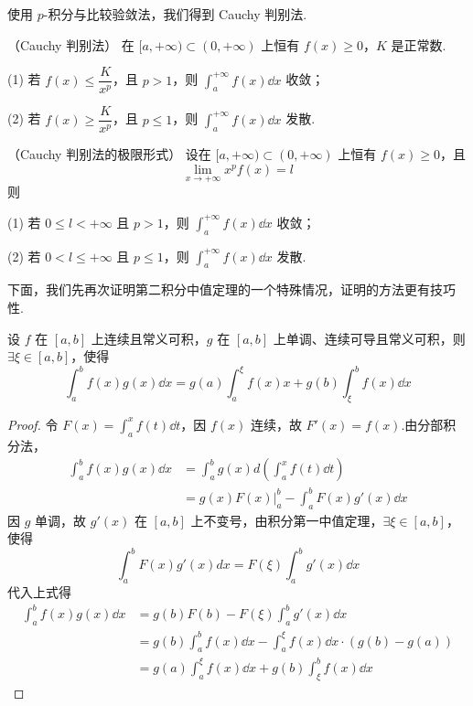 使用 $p$-积分与比较验敛法，我们得到 Cauchy 判别法.
\begin{corollary}
	（Cauchy 判别法）
	在 $[a,+\infty) \subset (0,+\infty)$ 上恒有 $f(x) \ge 0$，$K$ 是正常数.
	
	(1) 若 $f(x) \le \dfrac{K}{x^p}$，且 $p>1$，则 $\displaystyle\int_a^{+\infty} f(x)\dd x$ 收敛；
	
	(2) 若 $f(x) \ge \dfrac{K}{x^p}$，且 $p \le 1$，则 $\displaystyle\int_a^{+\infty} f(x)\dd x$ 发散.
\end{corollary}
\begin{corollary}
	（Cauchy 判别法的极限形式）
	设在 $[a,+\infty) \subset (0,+\infty)$ 上恒有 $f(x) \ge 0$，且
	\[
	\lim_{x \to +\infty} x^p f(x) = l
	\]
	则
	
	(1) 若 $0 \le l < +\infty$ 且 $p>1$，则 $\displaystyle\int_a^{+\infty} f(x)\dd x$ 收敛；
	
	(2) 若 $0 < l \le +\infty$ 且 $p \le 1$，则 $\displaystyle\int_a^{+\infty} f(x)\dd x$ 发散.
\end{corollary}


下面，我们先再次证明第二积分中值定理的一个特殊情况，证明的方法更有技巧性.
\begin{proposition}
	设 $f$ 在 $[a,b]$ 上连续且常义可积，$g$ 在 $[a,b]$ 上单调、连续可导且常义可积，则 $\exists \xi \in [a,b]$，使得
	\[
	\int_a^b f(x)g(x)\dd x = g(a)\int_a^\xi f(x)x + g(b)\int_\xi^b f(x)\dd x
	\]
\end{proposition}
\begin{proof}
	令 $F(x) = \displaystyle\int_a^x f(t)\dd t$，因 $f(x)$ 连续，故 $F'(x)=f(x)$.由分部积分法，
	\[
	\begin{aligned}
		\int_a^b f(x)g(x)\dd x &= \int_a^b g(x) d\left( \int_a^x f(t)\dd t \right) \\
		&= \left. g(x)F(x) \right|_a^b - \int_a^b F(x)g'(x)\dd x
	\end{aligned}
	\]
	因 $g$ 单调，故 $g'(x)$ 在 $[a,b]$ 上不变号，由积分第一中值定理，$\exists \xi \in [a,b]$，使得
	\[
	\int_a^b F(x)g'(x)dx = F(\xi)\int_a^b g'(x)\dd x
	\]
	代入上式得
	\[
	\begin{aligned}
		\int_a^b f(x)g(x)\dd x &= g(b)F(b) - F(\xi)\int_a^b g'(x)\dd x \\
		&= g(b)\int_a^b f(x)\dd x - \int_a^\xi f(x)\dd x \cdot \left( g(b)-g(a) \right) \\
		&= g(a)\int_a^\xi f(x)\dd x + g(b)\int_\xi^b f(x)\dd x
	\end{aligned}
	\]
\end{proof}

